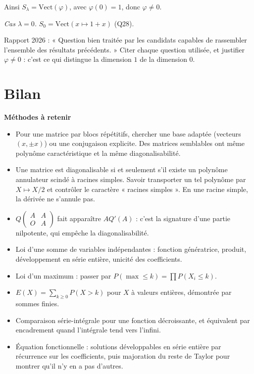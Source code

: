 \documentclass[11pt,a4paper]{article}
\providecommand{\tightlist}{\setlength{\itemsep}{0pt}\setlength{\parskip}{0pt}}
\newcommand{\equationajustee}[1]{%
  \sbox{\boiteequation}{$\displaystyle #1$}%
  \ifdim\wd\boiteequation>\linewidth
    \[\resizebox{\linewidth}{!}{\usebox{\boiteequation}}\]%
  \else
    \[#1\]%
  \fi}
\begin{document}
Ainsi \(S_\lambda=\mathrm{Vect}(\varphi)\), avec \(\varphi(0)=1\), donc \(\varphi\ne0\).

\emph{Cas \(\lambda=0\).} \(S_0=\mathrm{Vect}(x\mapsto1+x)\) (Q28).
\equationajustee{\boxed{\dim S_\lambda=1\ \text{pour tout }\lambda\in[-1,1].}}

\begin{jury}

Rapport 2026 : « Question bien traitée par les candidats capables de rassembler l'ensemble des résultats précédents. » Citer chaque question utilisée, et justifier \(\varphi\ne0\) : c'est ce qui distingue la dimension \(1\) de la dimension \(0\).

\end{jury}

\hypertarget{bilan}{%
\section{Bilan}\label{bilan}}

\textbf{Méthodes à retenir}

\begin{itemize}
\tightlist
\item
  Pour une matrice par blocs répétitifs, chercher une base adaptée (vecteurs \((x,\pm x)\)) ou une conjugaison explicite. Des matrices semblables ont même polynôme caractéristique et la même diagonalisabilité.
\item
  Une matrice est diagonalisable si et seulement s'il existe un polynôme annulateur scindé à racines simples. Savoir transporter un tel polynôme par \(X\mapsto X/2\) et contrôler le caractère « racines simples ». En une racine simple, la dérivée ne s'annule pas.
\item
  \(Q\begin{pmatrix}A&A\\O&A\end{pmatrix}\) fait apparaître \(AQ'(A)\) : c'est la signature d'une partie nilpotente, qui empêche la diagonalisabilité.
\item
  Loi d'une somme de variables indépendantes : fonction génératrice, produit, développement en série entière, unicité des coefficients.
\item
  Loi d'un maximum : passer par \(P(\max\le k)=\prod P(X_i\le k)\).
\item
  \(E(X)=\sum_{k\ge0}P(X>k)\) pour \(X\) à valeurs entières, démontrée par sommes finies.
\item
  Comparaison série-intégrale pour une fonction décroissante, et équivalent par encadrement quand l'intégrale tend vers l'infini.
\item
  Équation fonctionnelle : solutions développables en série entière par récurrence sur les coefficients, puis majoration du reste de Taylor pour montrer qu'il n'y en a pas d'autres.
\end{itemize}
\end{document}
